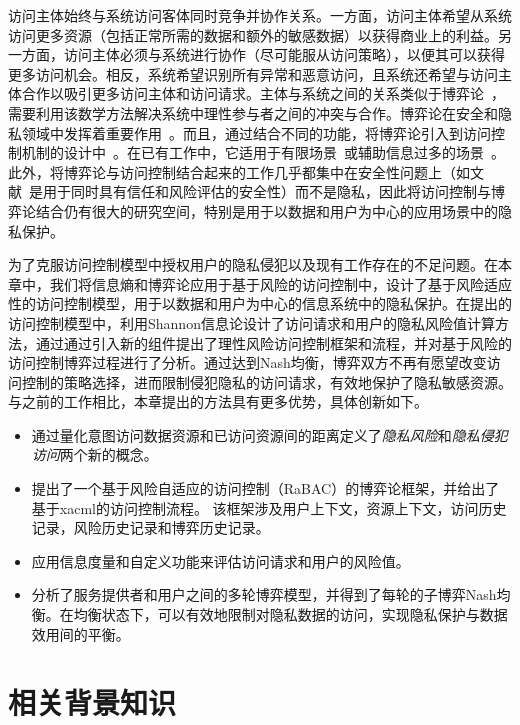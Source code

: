 访问主体始终与系统访问客体同时竞争并协作关系。一方面，访问主体希望从系统访问更多资源（包括正常所需的数据和额外的敏感数据）以获得商业上的利益。另一方面，访问主体必须与系统进行协作（尽可能服从访问策略），以便其可以获得更多访问机会。相反，系统希望识别所有异常和恶意访问，且系统还希望与访问主体合作以吸引更多访问主体和访问请求。主体与系统之间的关系类似于博弈论~\cite{gibbons1992game}，需要利用该数学方法解决系统中理性参与者之间的冲突与合作。博弈论在安全和隐私领域中发挥着重要作用~\cite{do2017game,zhu2018game}。而且，通过结合不同的功能，将博弈论引入到访问控制机制的设计中~\cite{hu2014game,zhang2015towards,liu2016dynamic,gao2018game, helil2017non}。在已有工作中，它适用于有限场景~\cite{hu2014game,gao2018game}或辅助信息过多的场景~\cite{zhang2015towards,liu2016dynamic,helil2017non}。此外，将博弈论与访问控制结合起来的工作几乎都集中在安全性问题上（如文献~\cite{helil2017non}是用于同时具有信任和风险评估的安全性）而不是隐私，因此将访问控制与博弈论结合仍有很大的研究空间，特别是用于以数据和用户为中心的应用场景中的隐私保护。

为了克服访问控制模型中授权用户的隐私侵犯以及现有工作存在的不足问题。在本章中，我们将信息熵和博弈论应用于基于风险的访问控制中，设计了基于风险适应性的访问控制模型，用于以数据和用户为中心的信息系统中的隐私保护。在提出的访问控制模型中，利用Shannon信息论设计了访问请求和用户的隐私风险值计算方法，通过通过引入新的组件提出了理性风险访问控制框架和流程，并对基于风险的访问控制博弈过程进行了分析。通过达到Nash均衡，博弈双方不再有愿望改变访问控制的策略选择，进而限制侵犯隐私的访问请求，有效地保护了隐私敏感资源。与之前的工作相比，本章提出的方法具有更多优势，具体创新如下。

\begin{itemize}
	
	\item 通过量化意图访问数据资源和已访问资源间的距离定义了\textit{隐私风险}和\textit{隐私侵犯访问}两个新的概念。
	\item 提出了一个基于风险自适应的访问控制（RaBAC）的博弈论框架，并给出了基于xacml的访问控制流程。
	该框架涉及用户上下文，资源上下文，访问历史记录，风险历史记录和博弈历史记录。
	\item 应用信息度量和自定义功能来评估访问请求和用户的风险值。
	\item 分析了服务提供者和用户之间的多轮博弈模型，并得到了每轮的子博弈Nash均衡。在均衡状态下，可以有效地限制对隐私数据的访问，实现隐私保护与数据效用间的平衡。
\end{itemize}


\section{相关背景知识}
\label{sec:preliminaries}


